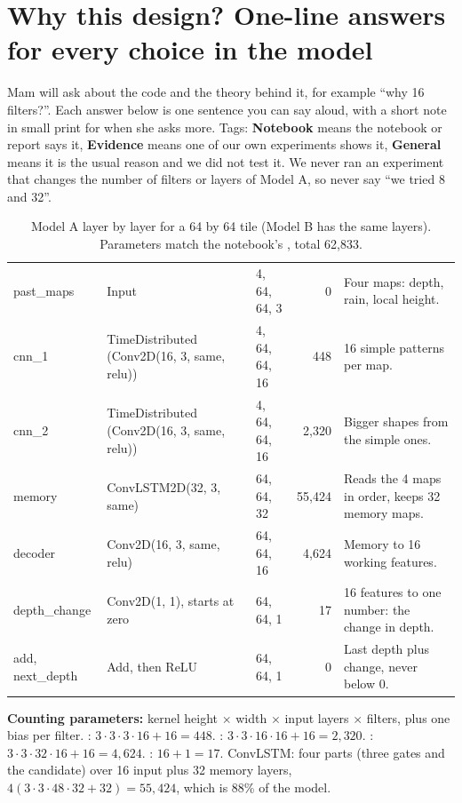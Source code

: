 \section{Why this design? One-line answers for every choice in the model}\label{ch:design}

Mam will ask about the code and the theory behind it, for example ``why 16 filters?''. Each answer below is one sentence you can say aloud, with a short note in small print for when she asks more. Tags: \textbf{Notebook} means the notebook or report says it, \textbf{Evidence} means one of our own experiments shows it, \textbf{General} means it is the usual reason and we did not test it. We never ran an experiment that changes the number of filters or layers of Model A, so never say ``we tried 8 and 32''.

\begin{table}[!htbp]
\centering\small
\caption{Model A layer by layer for a 64 by 64 tile (Model B has the same layers). Parameters match the notebook's , total 62,833.}\label{tab:layers}
\begin{tabularx}{\linewidth}{|>{\ttfamily}p{2.2cm}|p{3.6cm}|p{2.5cm}|r|Y|}
\hline
{}  &  &  &  & \\ \hline
past\_maps & Input & 4, 64, 64, 3 & 0 & Four maps: depth, rain, local height.\\ \hline
cnn\_1 & TimeDistributed (Conv2D(16, 3, same, relu)) & 4, 64, 64, 16 & 448 & 16 simple patterns per map.\\ \hline
cnn\_2 & TimeDistributed (Conv2D(16, 3, same, relu)) & 4, 64, 64, 16 & 2,320 & Bigger shapes from the simple ones.\\ \hline
memory & ConvLSTM2D(32, 3, same) & 64, 64, 32 & 55,424 & Reads the 4 maps in order, keeps 32 memory maps.\\ \hline
decoder & Conv2D(16, 3, same, relu) & 64, 64, 16 & 4,624 & Memory to 16 working features.\\ \hline
depth\_change & Conv2D(1, 1), starts at zero & 64, 64, 1 & 17 & 16 features to one number: the change in depth.\\ \hline
add, next\_depth & Add, then ReLU & 64, 64, 1 & 0 & Last depth plus change, never below 0.\\ \hline
\end{tabularx}
\end{table}
\textbf{Counting parameters:} kernel height $\times$ width $\times$ input layers $\times$ filters, plus one bias per filter. : $3\cdot3\cdot3\cdot16+16=448$. : $3\cdot3\cdot16\cdot16+16=2{,}320$. : $3\cdot3\cdot32\cdot16+16=4{,}624$. : $16+1=17$. ConvLSTM: four parts (three gates and the candidate) over 16 input plus 32 memory layers, $4(3\cdot3\cdot48\cdot32+32)=55{,}424$, which is 88\% of the model.


